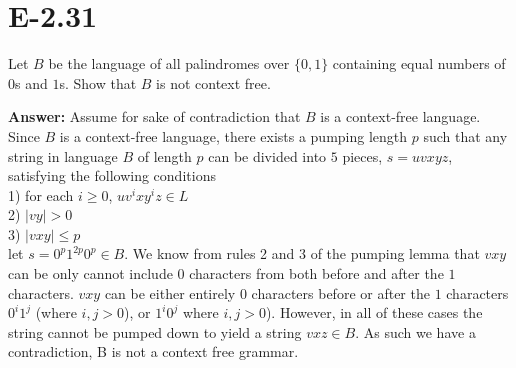 \documentclass{article}
\begin{document}
\section*{E-2.31}
Let $B$ be the language of all palindromes over $\{0,1\}$ containing equal
numbers of $0$s and $1$s.  Show that $B$ is not context free.

{\bf Answer: } Assume for sake of contradiction that $B$ is a context-free language. Since $B$ is a context-free language, there exists a pumping length $p$ such that any string in language $B$ of length $p$ can be divided into $5$ pieces, $s = uvxyz$, satisfying the following conditions \\
1) for each $i\geq 0$, $uv^ixy^iz \in L$ \\
2) $|vy| >0$ \\
3) $|vxy| \leq p$ \\
let $s = 0^p1^{2p}0^p \in B$. We know from rules 2 and 3 of the pumping lemma that $vxy$ can be only cannot include $0$ characters from both before and after the $1$ characters. $vxy$ can be either entirely $0$ characters before or after the $1$ characters $0^i1^j$ (where $i,j > 0$), or $ 1^i0^j$ where $i,j >0$). However, in all of these cases the string cannot be pumped down to yield a string $vxz \in B$. As such we have a contradiction, B is not a context free grammar.
\end{document}
